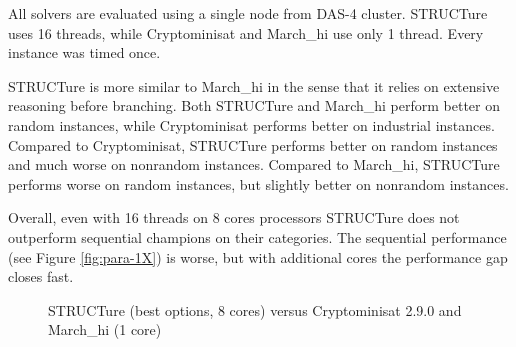 All solvers are evaluated using a single node from DAS-4 cluster.
STRUCTure uses 16 threads, while Cryptominisat and March\_hi
use only 1 thread. Every instance was timed once.

STRUCTure is more similar to March\_hi in the sense that it relies on
extensive reasoning before branching. Both STRUCTure and March\_hi
perform better on random instances, while Cryptominisat performs
better on industrial instances.  Compared to Cryptominisat, STRUCTure
performs better on random instances and much worse on nonrandom
instances. Compared to March\_hi, STRUCTure performs worse on
random instances, but slightly better on nonrandom instances.

Overall, even with 16 threads on 8 cores processors STRUCTure
does not outperform sequential champions on their categories.
The sequential performance (see Figure \ref{fig:para-1X}) is worse,
but with additional cores the performance gap closes fast.


\begin{figure}
  \centering
  \caption{STRUCTure (best options, 8 cores) versus Cryptominisat
  2.9.0 and March\_hi (1 core)}
  \label{fig:compare}
\end{figure}
